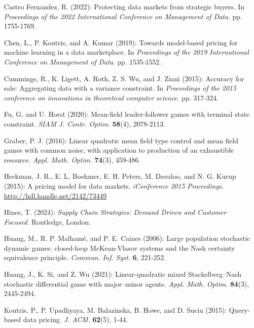 \documentclass[11pt]{article}
\numberwithin{equation}{section}
\begin{document}
\begin{thebibliography}{}
{		
		Castro Fernandez, R. (2022): Protecting data markets from strategic buyers. In {\it Proceedings of the 2022 International Conference on Management of Data}. pp. 1755-1769.
		
		Chen, L., P. Koutris, and A. Kumar (2019): Towards model-based pricing for machine learning in a data marketplace. In {\it Proceedings of the 2019 International Conference on Management of Data}. pp. 1535-1552. 

        Cummings, R., K. Ligett, A. Roth, Z. S. Wu, and J. Ziani (2015): Accuracy for sale: Aggregating data with a variance constraint. In {\it Proceedings of the 2015 conference on innovations in theoretical computer science}. pp. 317-324.
        
		Fu, G. and U. Horst (2020): Mean-field leader-follower games with terminal state constraint. {\it SIAM J. Contr. Optim.} {\bf 58}(4), 2078-2113.
		
		Graber, P. J. (2016): Linear quadratic mean field type control and mean field games with common noise, with application to production of an exhaustible resource. {\it Appl. Math. Optim.} {\bf 74}(3), 459-486.
		
		Heckman, J. R., E. L. Boehmer, E. H. Peters, M. Davaloo, and N. G. Kurup (2015): A pricing model for data markets. {\it iConference 2015 Proceedings}. \url{http://hdl.handle.net/2142/73449}
		
		Hines, T. (2024): {\it Supply Chain Strategies: Demand Driven and Customer Focused}. Routledge, London.
		
		Huang, M., R. P. Malhamé, and P. E. Caines (2006): Large population stochastic dynamic games: closed-loop McKean-Vlasov systems and the Nash certainty equivalence principle. {\it Commun. Inf. Syst.} \textbf{6}, 221-252.
		
		Huang, J., K. Si, and Z. Wu (2021): Linear-quadratic mixed Stackelberg–Nash stochastic differential game with major–minor agents. {\it Appl. Math. Optim.} {\bf 84}(3), 2445-2494.
		
		Koutris, P., P. Upadhyaya, M. Balazinska, B. Howe, and D. Suciu (2015): Query-based data pricing. {\it J. ACM.} {\bf 62}(5), 1-44.
		
}
\end{thebibliography}
\end{document}
